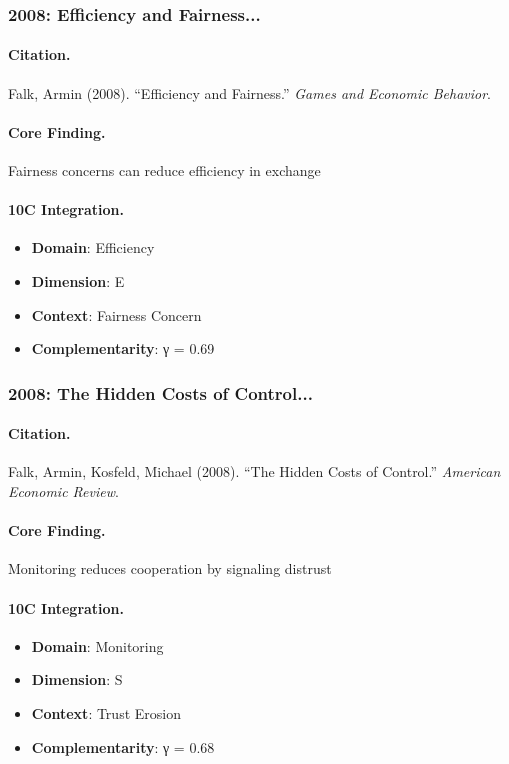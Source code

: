 \subsubsection{2008: Efficiency and Fairness...}

\paragraph{Citation.}
Falk, Armin (2008). ``Efficiency and Fairness.''
\textit{Games and Economic Behavior}.

\paragraph{Core Finding.}
Fairness concerns can reduce efficiency in exchange

\paragraph{10C Integration.}
\begin{itemize}[nosep]
  \item \textbf{Domain}: Efficiency
  \item \textbf{Dimension}: E
  \item \textbf{Context}: Fairness Concern
  \item \textbf{Complementarity}: γ = 0.69
\end{itemize}


\subsubsection{2008: The Hidden Costs of Control...}

\paragraph{Citation.}
Falk, Armin, Kosfeld, Michael (2008). ``The Hidden Costs of Control.''
\textit{American Economic Review}.

\paragraph{Core Finding.}
Monitoring reduces cooperation by signaling distrust

\paragraph{10C Integration.}
\begin{itemize}[nosep]
  \item \textbf{Domain}: Monitoring
  \item \textbf{Dimension}: S
  \item \textbf{Context}: Trust Erosion
  \item \textbf{Complementarity}: γ = 0.68
\end{itemize}


